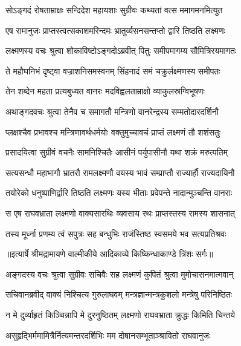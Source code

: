\twolineshloka
{सोऽङ्गदं रोषताम्राक्षः सन्दिदेश महायशाः}
{सुग्रीवः कथ्यतां वत्स ममागमनमित्युत} %

\twolineshloka
{एष रामानुजः प्राप्तस्त्वत्सकाशमरिन्दमः}
{भ्रातुर्व्यसनसन्तप्तो द्वारि तिष्ठति लक्ष्मणः} %

\twolineshloka
{लक्ष्मणस्य वचः श्रुत्वा शोकाविष्टोऽङ्गदोऽब्रवीत्}
{पितुः समीपमागम्य सौमित्रिरयमागतः} %

\twolineshloka
{ते महौघनिभं दृष्ट्वा वज्राशनिसमस्वनम्}
{सिंहनादं समं चक्रुर्लक्ष्मणस्य समीपतः} %

\twolineshloka
{तेन शब्देन महता प्रत्यबुध्यत वानरः}
{मदविह्वलताम्राक्षो व्याकुलस्रग्विभूषणः} %

\twolineshloka
{अथाङ्गदवचः श्रुत्वा तेनैव च समागतौ}
{मन्त्रिणो वानरेन्द्रस्य सम्मतोदारदर्शिनौ} %

\twolineshloka
{प्लक्षश्चैव प्रभावश्च मन्त्रिणावर्थधर्मयोः}
{वक्तुमुच्चावचं प्राप्तं लक्ष्मणं तौ शशंसतुः} %

\twolineshloka
{प्रसादयित्वा सुग्रीवं वचनैः सामनिश्चितैः}
{आसीनं पर्युपासीनौ यथा शक्रं मरुत्पतिम्} %

\twolineshloka
{सत्यसन्धौ महाभागौ भ्रातरौ रामलक्ष्मणौ}
{वयस्य भावं सम्प्राप्तौ राज्यार्हौ राज्यदायिनौ} %

\twolineshloka
{तयोरेको धनुष्पाणिर्द्वारि तिष्ठति लक्ष्मणः}
{यस्य भीताः प्रवेपन्ते नादान्मुञ्चन्ति वानराः} %

\twolineshloka
{स एष राघवभ्राता लक्ष्मणो वाक्यसारथिः}
{व्यवसाय रथः प्राप्तस्तस्य रामस्य शासनात्} %

\twolineshloka
{तस्य मूर्ध्ना प्रणम्य त्वं सपुत्रः सह बन्धुभिः}
{राजंस्तिष्ठ स्वसमये भव सत्यप्रतिश्रवः} %


{॥इत्यार्षे श्रीमद्रामायणे वाल्मीकीये आदिकाव्ये किष्किन्धाकाण्डे त्रिंशः सर्गः॥}


\twolineshloka
{अङ्गदस्य वचः श्रुत्वा सुग्रीवः सचिवैः सह}
{लक्ष्मणं कुपितं श्रुत्वा मुमोचासनमात्मवान्} %

\twolineshloka
{सचिवानब्रवीद् वाक्यं निश्चित्य गुरुलाघवम्}
{मन्त्रज्ञान्मन्त्रकुशलो मन्त्रेषु परिनिष्ठितः} %

\twolineshloka
{न मे दुर्व्याहृतं किञ्चिन्नापि मे दुरनुष्ठितम्}
{लक्ष्मणो राघवभ्राता क्रुद्धः किमिति चिन्तये} %

\twolineshloka
{असुहृद्भिर्ममामित्रैर्नित्यमन्तरदर्शिभिः}
{मम दोषानसम्भूताञ्श्रावितो राघवानुजः} %

